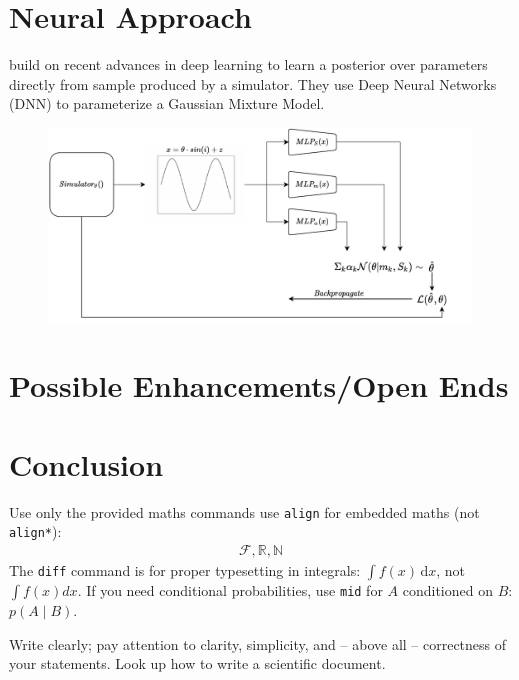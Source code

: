 \documentclass[12pt]{article}
\newcommand{\Rbb}{\mathbb{R}}
\newcommand{\Nbb}{\mathbb{N}}
\newcommand{\Fcal}{\mathcal{F}}
\newcommand{\diff}{\,\text{d}}
\begin{document}
 



\section*{Neural Approach}
\citet{papamakarios2016fast} build on recent advances in deep learning to learn a posterior over parameters directly from sample produced by a simulator. They use Deep Neural Networks (DNN) to parameterize a Gaussian Mixture Model.


\begin{figure}
	\centering
	\includegraphics[width=.8\linewidth]{figures/sbi_vis.pdf}
	\caption{}
\end{figure} 

\section*{Possible Enhancements/Open Ends}
\section*{Conclusion}







Use only the provided maths commands use \texttt{align} for embedded maths (not \texttt{align*}):
\begin{align}
    \Fcal, \Rbb, \Nbb
\end{align}
The \texttt{diff} command is for proper typesetting in integrals: $\int f(x) \diff x$, not $\int f(x) dx$.
If you need conditional probabilities, use \texttt{mid} for $A$ conditioned on $B$: $p(A \mid B)$.

Write clearly; pay attention to clarity, simplicity, and -- above all -- correctness of your statements. Look up how to write a scientific document.


\end{document}

